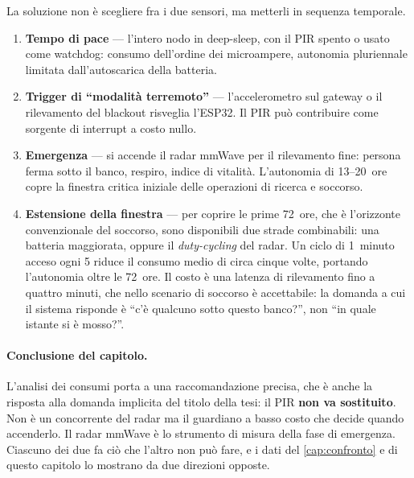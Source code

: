La soluzione non è scegliere fra i due sensori, ma metterli in sequenza temporale.

\begin{enumerate}[leftmargin=1.8em,itemsep=4pt]
  \item \textbf{Tempo di pace} --- l'intero nodo in deep-sleep, con il PIR spento o
        usato come watchdog: consumo dell'ordine dei microampere, autonomia
        pluriennale limitata dall'autoscarica della batteria.
  \item \textbf{Trigger di ``modalità terremoto''} --- l'accelerometro sul gateway
        o il rilevamento del blackout risveglia l'ESP32. Il PIR può contribuire come
        sorgente di interrupt a costo nullo.
  \item \textbf{Emergenza} --- si accende il radar mmWave per il rilevamento fine:
        persona ferma sotto il banco, respiro, indice di vitalità. L'autonomia di
        13--20~ore copre la finestra critica iniziale delle operazioni di ricerca e
        soccorso.
  \item \textbf{Estensione della finestra} --- per coprire le prime 72~ore, che è
        l'orizzonte convenzionale del soccorso, sono disponibili due strade
        combinabili: una batteria maggiorata, oppure il \emph{duty-cycling} del
        radar. Un ciclo di 1~minuto acceso ogni 5 riduce il consumo medio di circa
        cinque volte, portando l'autonomia oltre le 72~ore. Il costo è una latenza
        di rilevamento fino a quattro minuti, che nello scenario di soccorso è
        accettabile: la domanda a cui il sistema risponde è ``c'è qualcuno sotto
        questo banco?'', non ``in quale istante si è mosso?''.
\end{enumerate}

\paragraph{Conclusione del capitolo.} L'analisi dei consumi porta a una
raccomandazione precisa, che è anche la risposta alla domanda implicita del titolo
della tesi: il PIR \textbf{non va sostituito}. Non è un concorrente del radar ma il
guardiano a basso costo che decide quando accenderlo. Il radar mmWave è lo strumento
di misura della fase di emergenza. Ciascuno dei due fa ciò che l'altro non può fare,
e i dati del \cref{cap:confronto} e di questo capitolo lo mostrano da due direzioni
opposte.

